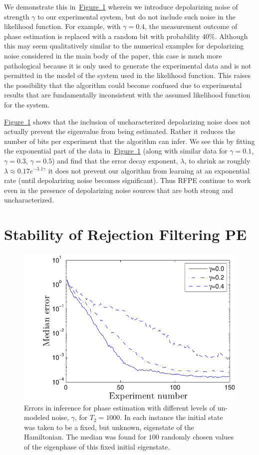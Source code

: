 \documentclass[aps,pra,amsmath,twocolumn,amssymb,superscriptaddress]{revtex4-1}
\newcommand{\fig}[1]{\hyperref[fig:#1]{Figure~\ref*{fig:#1}}}
\begin{document}
We demonstrate this in~\fig{gamma} wherein we introduce depolarizing noise of strength $\gamma$ to our experimental system, but do not include such noise in the likelihood function.  For example, with $\gamma=0.4$, the measurement outcome of phase estimation is replaced with a random bit with probability $40\%$.  Although this may seem qualitatively similar to the numerical examples for depolarizing noise considered in the main body of the paper, this case is much more pathological because it is only used to generate the experimental data and is not permitted in the model of the system used in the likelihood function.  This raises the possibility that the algorithm could become confused due to experimental results that are fundamentally inconsistent with the assumed likelihood function for the system.

\fig{gamma} shows that the inclusion of uncharacterized depolarizing noise does not actually prevent the eigenvalue from being estimated.  Rather it reduces the number of bits per experiment that the algorithm can infer.  We see this by fitting the exponential part of the data in~\fig{gamma} (along with similar data for $\gamma=0.1$, $\gamma=0.3$, $\gamma=0.5$) and find that the error decay exponent, $\lambda$, to shrink as roughly $\lambda \approx 0.17e^{-3.1\gamma}$ it does not prevent our algorithm from learning at an exponential rate (until depolarizing noise becomes significant).  Thus RFPE continue to work even in the presence of depolarizing noise sources that are both strong and uncharacterized.



\section{Stability of Rejection Filtering PE}
\label{app:stability}

\begin{figure}
    \begin{centering}
\includegraphics[width=0.45\linewidth]{Gammascale.pdf}
    \end{centering}
    \caption{\label{fig:gamma}
Errors in inference for phase estimation with different levels of un-modeled noise, $\gamma$, for $T_2=1000$.  In each instance the initial state was taken to be a fixed, but unknown, eigenstate of the Hamiltonian.  The median was found for $100$ randomly chosen values of the eigenphase of this fixed initial eigenstate.
    }
\end{figure}
\end{document}
